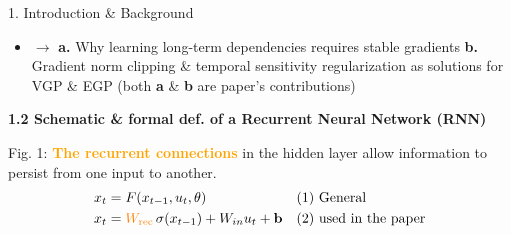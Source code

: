 \documentclass[final]{beamer}
\begin{document}
\begin{frame}[t]
\begin{columns}[t,totalwidth=\textwidth]
\begin{column}{0.3\textwidth}
\begin{block}{1. Introduction \& Background}
\begin{itemize}
            \item $\rightarrow$ \textbf{a.} 
            Why learning long-term dependencies requires stable gradients
\textbf{b.} Gradient norm clipping \& temporal sensitivity regularization as  solutions for VGP \& EGP (both \textbf{a} \& \textbf{b} are paper's contributions)
            \end{itemize}


        \textbf{1.2 Schematic \& formal def. of a Recurrent Neural Network (RNN)}


        \begin{center}
       \end{center}
       \vspace{-.6em}
{{Fig. 1: \textcolor{orange}{\textbf{The recurrent connections}} in the hidden layer allow information to persist from one input to another.}}
   \begin{align*}
     x_t &= F(x_{t-1}, u_t, \theta) && \text{(1) General} \\
     x_t &= \textcolor{orange}{W_{\text{rec}}} \, \sigma(x_{t-1}) + W_{in} u_t + \mathbf{b} && \text{(2) used in the paper}
   \end{align*}


\end{block}
\end{column}
\end{columns}
\end{frame}
\end{document}
